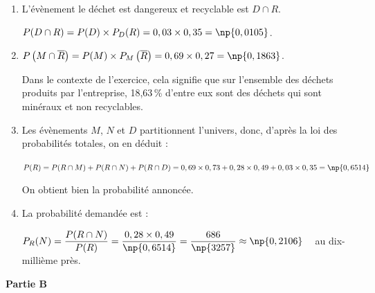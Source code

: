 \begin{enumerate}
\item L'évènement \og le déchet est dangereux et recyclable \fg{} est $D \cap R$.

$P(D \cap R) = P(D) \times P_{D}(R) = 0,03 \times 0,35 = \np{0,0105}$.

\item $P\left(M \cap \overline{R}\right) = P(M) \times P_{M}\left(\overline{R}\right) = 0,69 \times 0,27 = \np{0,1863} $.

Dans le contexte de l'exercice, cela signifie que sur l'ensemble des déchets produits par l'entreprise, 18,63\,\% d'entre eux sont des déchets qui sont minéraux et non recyclables.

\item Les évènements $M$, $N$ et $D$ partitionnent l'univers, donc, d'après la loi des probabilités totales, on en déduit :

$P(R) = P(R \cap M) + P(R \cap N) + P(R \cap D) = 0,69 \times 0,73 + 0,28 \times 0,49 + 0,03 \times 0,35 = \np{0,6514}$

On obtient bien la probabilité annoncée.

\item La probabilité demandée est :

$ P_{R}(N) = \dfrac{P(R \cap N)}{P(R)} = \dfrac{0,28 \times 0,49}{\np{0,6514}} = \dfrac{686}{\np{3257}}\approx \np{0,2106}$ ~ au dix-millième près.

\end{enumerate}

\medskip

\textbf{Partie B}

\medskip

